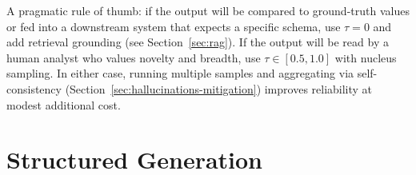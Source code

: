 \begin{context}
A pragmatic rule of thumb: if the output will be compared to ground-truth values
or fed into a downstream system that expects a specific schema, use $\tau = 0$ and
add retrieval grounding (see Section~\ref{sec:rag}).  If the output will be read
by a human analyst who values novelty and breadth, use $\tau \in [0.5, 1.0]$ with
nucleus sampling.  In either case, running multiple samples and aggregating via
self-consistency (Section~\ref{sec:hallucinations-mitigation}) improves reliability
at modest additional cost.

\end{context}

\section{Structured Generation}
\label{sec:structured-gen}

